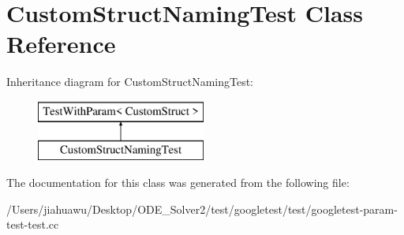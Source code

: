 \hypertarget{class_custom_struct_naming_test}{}\section{Custom\+Struct\+Naming\+Test Class Reference}
\label{class_custom_struct_naming_test}
Inheritance diagram for Custom\+Struct\+Naming\+Test\+:\begin{figure}[H]
\begin{center}
\leavevmode
\includegraphics[height=2.000000cm]{class_custom_struct_naming_test}
\end{center}
\end{figure}


The documentation for this class was generated from the following file\+:\begin{DoxyCompactItemize}
\item 
/\+Users/jiahuawu/\+Desktop/\+O\+D\+E\+\_\+\+Solver2/test/googletest/test/googletest-\/param-\/test-\/test.\+cc\end{DoxyCompactItemize}
